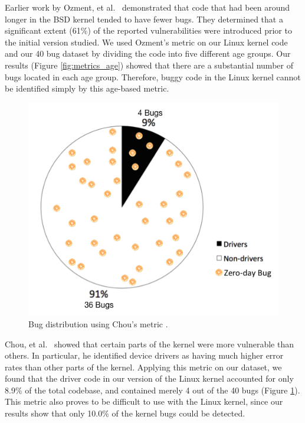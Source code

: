 Earlier work by Ozment, et al.~\cite{ozment2006milk} demonstrated that code that
had been around longer in the BSD kernel tended to have fewer bugs.
They determined that a significant extent (61\%) of the reported
vulnerabilities were
introduced prior to the initial version studied.
We used Ozment's metric on our Linux kernel code and our 40 bug dataset
by dividing the code into five different age groups.
Our results (Figure \ref{fig:metrics_age}) showed that there are a substantial
number of bugs located in each age group.
Therefore, buggy code in the Linux kernel cannot be identified simply
by this age-based metric.


\begin{figure}
\centering
\includegraphics[width=0.9\columnwidth]{diagram/metrics_drivers.png}
\caption{\small Bug distribution using Chou's metric \cite{PittSFIeld}.}
\label{fig:metrics_drivers}
\end{figure}

Chou, et al.~\cite{PittSFIeld} showed that certain parts of the kernel
were more vulnerable than others. In particular, he identified device drivers as
having much higher error rates than other parts of the kernel.
Applying this metric on our dataset, we found that the driver code in our version
of the Linux kernel accounted for only 8.9\% of the total codebase, and contained
merely 4 out of the 40 bugs (Figure \ref{fig:metrics_drivers}).
This metric also proves to be difficult to use with the
Linux kernel, since our results show that
only 10.0\% of the kernel bugs could be detected.


